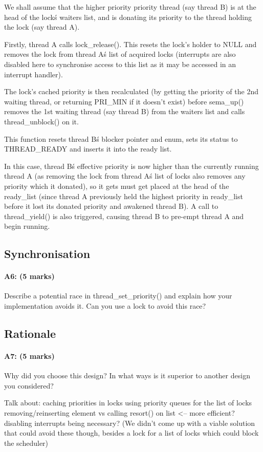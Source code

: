 We shall assume that the higher priority priority thread (say thread B) is at the head of the lock\'s waiters list, and is donating its priority to the thread holding the lock (say thread A).

Firstly, thread A calls lock\_release(). This resets the lock's holder to NULL and removes the lock from thread A\'s list of acquired locks (interrupts are also disabled here to synchronise access to this list as it may be accessed in an interrupt handler).

The lock's cached priority is then recalculated (by getting the priority of the 2nd waiting thread, or returning PRI\_MIN if it doesn't exist) before sema\_up() removes the 1st waiting thread (say thread B) from the waiters list and calls thread\_unblock() on it.

This function resets thread B\'s blocker pointer and enum, sets its status to THREAD\_READY and inserts it into the ready list.

In this case, thread B\'s effective priority is now higher than the currently running thread A (as removing the lock from thread A\'s list of locks also removes any priority which it donated), so it gets must get placed at the head of the ready\_list (since thread A previously held the highest priority in ready\_list before it lost its donated priority and awakened thread B). A call to thread\_yield() is also triggered, causing thread B to pre-empt thread A and begin running.

\subsection{Synchronisation}
\paragraph{A6: (5 marks)}
Describe a potential race in thread\_set\_priority() and explain how your implementation avoids it.  Can you use a lock to avoid this race?



\subsection{Rationale}
\paragraph{A7: (5 marks)}
Why did you choose this design?  In what ways is it superior to another design you considered?

Talk about:
	caching priorities in locks
	using priority queues for the list of locks
  removing/reinserting element vs calling resort() on list <-- more efficient?
	disabling interrupts being necessary? (We didn't come up with a viable solution that could avoid these though, besides a lock for a list of locks which could block the scheduler)
